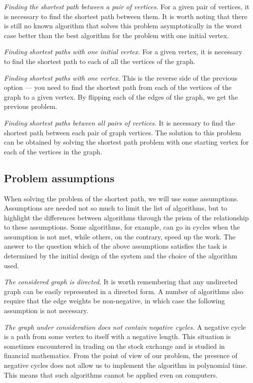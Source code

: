     \textit{Finding the shortest path between a pair of vertices.}
    For a given pair of vertices, it is necessary to find the shortest path between them.
    It is worth noting that there is still no known algorithm that solves this problem asymptotically in the worst case better than the best algorithm for the problem with one initial vertex.

    \textit{Finding shortest paths with one initial vertex.}
    For a given vertex, it is necessary to find the shortest path to each of all the vertices of the graph.

    \textit{Finding shortest paths with one vertex.}
    This is the reverse side of the previous option --- you need to find the shortest path from each of the vertices of the graph to a given vertex.
    By flipping each of the edges of the graph, we get the previous problem.

    \textit{Finding shortest paths between all pairs of vertices.}
    It is necessary to find the shortest path between each pair of graph vertices.
    The solution to this problem can be obtained by solving the shortest path problem with one starting vertex for each of the vertices in the graph.

    
    \subsection{Problem assumptions}
    When solving the problem of the shortest path, we will use some assumptions.
    Assumptions are needed not so much to limit the list of algorithms, but to highlight the differences between algorithms through the prism of the relationship to these assumptions.
    Some algorithms, for example, can go in cycles when the assumption is not met, while others, on the contrary, speed up the work.
    The answer to the question which of the above assumptions satisfies the task is determined by the initial design of the system and the choice of the algorithm used.
    
    \textit{The considered graph is directed.}
    It is worth remembering that any undirected graph can be easily represented in a directed form.
    A number of algorithms also require that the edge weights be non-negative, in which case the following assumption is not necessary.
    
    \textit{The graph under consideration does not contain negative cycles.}
    A negative cycle is a path from some vertex to itself with a negative length.
    This situation is sometimes encountered in trading on the stock exchange and is studied in financial mathematics.
    From the point of view of our problem, the presence of negative cycles does not allow us to implement the algorithm in polynomial time.
    This means that such algorithms cannot be applied even on computers.

